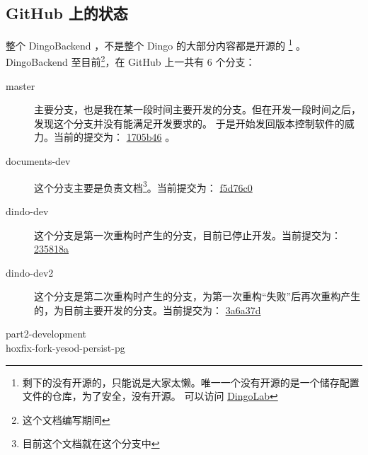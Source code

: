 \documentclass{dindo}
\begin{document}
  \subsection*{GitHub 上的状态}
    整个 DingoBackend ，不是整个 Dingo 的大部分内容都是开源的
      \footnote{剩下的没有开源的，只能说是大家太懒。唯一一个没有开源的是一个储存配置文件的仓库，为了安全，没有开源。
      可以访问 \href{https://github.com/DingoLab}{DingoLab}}
    。DingoBackend 至目前\footnote{这个文档编写期间}，在 GitHub 上一共有 6 个分支：
    \begin{description}
      \item[master] 主要分支，也是我在某一段时间主要开发的分支。但在开发一段时间之后，发现这个分支并没有能满足开发要求的。
        于是开始发回版本控制软件的威力。当前的提交为：
        \href{https://github.com/DingoLab/DingoBackend/commit/1705b461b8c2d9aa2245c2725006771ad8065995}{1705b46}
        。
      \item[documents-dev] 这个分支主要是负责文档\footnote{目前这个文档就在这个分支中}。当前提交为：
        \href{https://github.com/DingoLab/DingoBackend/commit/f5d76c0fc408337203fc1fd54393ef41372ac4ea}{f5d76c0}
      \item[dindo-dev] 这个分支是第一次重构时产生的分支，目前已停止开发。当前提交为：
        \href{https://github.com/DingoLab/DingoBackend/commit/235818a90dff38b8276ce53233c0cdaaff7acdf0}{235818a}
      \item[dindo-dev2] 这个分支是第二次重构时产生的分支，为第一次重构“失败”后再次重构产生的，为目前主要开发的分支。当前提交为：
        \href{https://github.com/DingoLab/DingoBackend/commit/3a6a37d1183b270685cee25ad031e707e5e3b7fd}{3a6a37d}
      \item[part2-development]
      \item[hoxfix-fork-yesod-persist-pg]
    \end{description}
\end{document}
